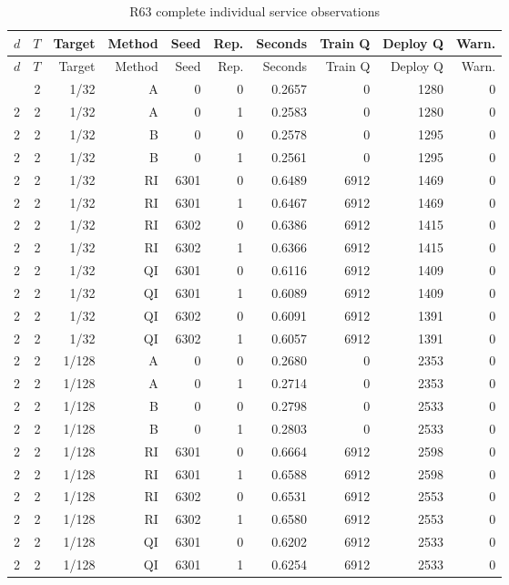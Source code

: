 \begingroup\small\setlength{\tabcolsep}{3pt}
\begin{longtable}{lrrrrrrrrr}
\caption{R63 complete individual service observations}\label{tab:all-R63-65}\\
\toprule
$d$ & $T$ & Target & Method & Seed & Rep. & Seconds & Train Q & Deploy Q & Warn. \\
\midrule
\endfirsthead
$d$ & $T$ & Target & Method & Seed & Rep. & Seconds & Train Q & Deploy Q & Warn. \\
\midrule
\endhead
\bottomrule
\endfoot
2 & 2 & 1/32 & A & 0 & 0 & 0.2657 & 0 & 1280 & 0 \\
2 & 2 & 1/32 & A & 0 & 1 & 0.2583 & 0 & 1280 & 0 \\
2 & 2 & 1/32 & B & 0 & 0 & 0.2578 & 0 & 1295 & 0 \\
2 & 2 & 1/32 & B & 0 & 1 & 0.2561 & 0 & 1295 & 0 \\
2 & 2 & 1/32 & RI & 6301 & 0 & 0.6489 & 6912 & 1469 & 0 \\
2 & 2 & 1/32 & RI & 6301 & 1 & 0.6467 & 6912 & 1469 & 0 \\
2 & 2 & 1/32 & RI & 6302 & 0 & 0.6386 & 6912 & 1415 & 0 \\
2 & 2 & 1/32 & RI & 6302 & 1 & 0.6366 & 6912 & 1415 & 0 \\
2 & 2 & 1/32 & QI & 6301 & 0 & 0.6116 & 6912 & 1409 & 0 \\
2 & 2 & 1/32 & QI & 6301 & 1 & 0.6089 & 6912 & 1409 & 0 \\
2 & 2 & 1/32 & QI & 6302 & 0 & 0.6091 & 6912 & 1391 & 0 \\
2 & 2 & 1/32 & QI & 6302 & 1 & 0.6057 & 6912 & 1391 & 0 \\
2 & 2 & 1/128 & A & 0 & 0 & 0.2680 & 0 & 2353 & 0 \\
2 & 2 & 1/128 & A & 0 & 1 & 0.2714 & 0 & 2353 & 0 \\
2 & 2 & 1/128 & B & 0 & 0 & 0.2798 & 0 & 2533 & 0 \\
2 & 2 & 1/128 & B & 0 & 1 & 0.2803 & 0 & 2533 & 0 \\
2 & 2 & 1/128 & RI & 6301 & 0 & 0.6664 & 6912 & 2598 & 0 \\
2 & 2 & 1/128 & RI & 6301 & 1 & 0.6588 & 6912 & 2598 & 0 \\
2 & 2 & 1/128 & RI & 6302 & 0 & 0.6531 & 6912 & 2553 & 0 \\
2 & 2 & 1/128 & RI & 6302 & 1 & 0.6580 & 6912 & 2553 & 0 \\
2 & 2 & 1/128 & QI & 6301 & 0 & 0.6202 & 6912 & 2533 & 0 \\
2 & 2 & 1/128 & QI & 6301 & 1 & 0.6254 & 6912 & 2533 & 0 \\

\end{longtable}
